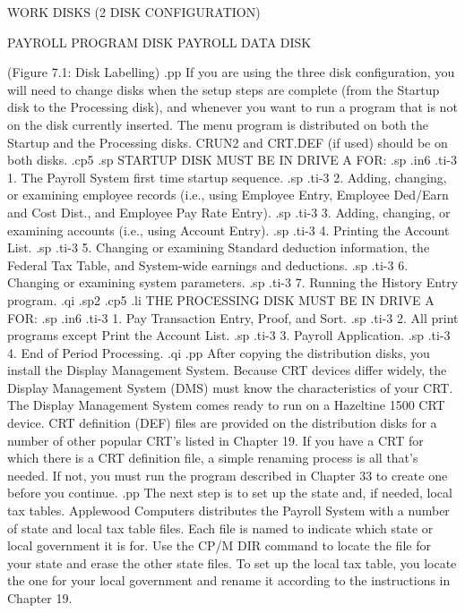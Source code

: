 							  WORK DISKS
						     (2 DISK CONFIGURATION)



      PAYROLL PROGRAM DISK	  PAYROLL DATA DISK

		 (Figure 7.1: Disk Labelling)
.pp
If you are using the three disk configuration, you will need to change disks
when the setup steps are complete (from the Startup disk to the Processing
disk), and whenever you want to run a program that is not on the disk currently
inserted.  The menu program is distributed on both the Startup and the
Processing disks.  CRUN2 and CRT.DEF (if used) should be on both disks.
.cp5
.sp
STARTUP DISK MUST BE IN DRIVE A FOR:
.sp
.in6
.ti-3
1. The Payroll System first time startup sequence.
.sp
.ti-3
2. Adding, changing, or examining employee records (i.e., using Employee
Entry, Employee Ded/Earn and Cost Dist., and Employee Pay Rate Entry).
.sp
.ti-3
3. Adding, changing, or examining accounts (i.e., using Account Entry).
.sp
.ti-3
4. Printing the Account List.
.sp
.ti-3
5. Changing or examining Standard deduction information, the Federal
Tax Table, and System-wide earnings and deductions.
.sp
.ti-3
6. Changing or examining system parameters.
.sp
.ti-3
7. Running the History Entry program.
.qi
.sp2
.cp5
.li
THE PROCESSING DISK MUST BE IN DRIVE A FOR:
.sp
.in6
.ti-3
1. Pay Transaction Entry, Proof, and Sort.
.sp
.ti-3
2. All print programs except Print the Account List.
.sp
.ti-3
3. Payroll Application.
.sp
.ti-3
4. End of Period Processing.
.qi
.pp
After copying the distribution disks, you install the Display
Management System.  Because CRT devices differ widely, the Display
Management System (DMS) must know the characteristics of your CRT.
The Display Management System comes ready to run on a Hazeltine 1500 CRT
device.
CRT definition (DEF) files are provided on the distribution disks for
a number of other popular CRT's listed in Chapter 19.  If you
have a CRT for which there is a CRT definition file, a simple
renaming process is all that's needed. If not, you must run the program
described in Chapter 33 to create one before you continue.
.pp
The next step is to set up the state and, if needed, local tax tables.
Applewood Computers distributes the Payroll System with a number
of state and local tax table files.  Each file is named to indicate
which state or local government it is for.  Use the CP/M DIR command
to locate the file for your state and erase the other state files.  To
set up the local tax table, you locate the one for your local government
and rename it according to the instructions in Chapter 19.
